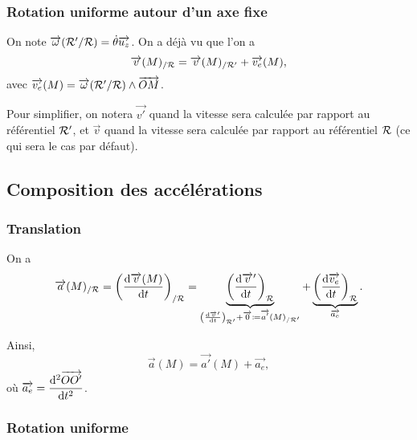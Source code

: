         \subsubsection{Rotation uniforme autour d'un axe fixe}

            On note $\protect\overrightarrow{{\omega}}(\mathcal{R}'/\mathcal{R})=\dot{\theta}\protect\overrightarrow{{u_z}}$. On a déjà vu que l'on a 
            \begin{equation}
                \protect\overrightarrow{{v}}(M)_{/\mathcal{R}}=\protect\overrightarrow{{v}}(M)_{/\mathcal{R}'}+\protect\overrightarrow{{v_e}}(M),
            \end{equation}
            avec $\protect\overrightarrow{{v_e}}(M)=\protect\overrightarrow{{\omega}}(\mathcal{R}'/\mathcal{R})\wedge\protect\overrightarrow{{OM}}$.

            Pour simplifier, on notera $\vec{v'}$ quand la vitesse sera calculée par rapport au référentiel $\mathcal{R}'$, et $\vec{v}$ quand la vitesse sera calculée par rapport au référentiel $\mathcal{R}$ (ce qui sera le cas par défaut).

    \subsection{Composition des accélérations}

        \subsubsection{Translation}

            On a
            \begin{equation}
                \protect\overrightarrow{{a}}(M)_{/\mathcal{R}}=\left(\dfrac{\mathrm{d}\protect\overrightarrow{{v}}(M)}{\mathrm{d} t}\right)_{/\mathcal{R}}=
                \underbrace{\left(\frac{\mathrm{d}\protect\overrightarrow{{v}}'}{\mathrm{d} t}\right)_{\mathcal{R}}}_{\left(\frac{\mathrm{d}\protect\overrightarrow{{v}}'}{\mathrm{d} t}\right)_{\mathcal{R}'}+\protect\overrightarrow{{0}}\coloneqq\protect\overrightarrow{{a'}}(M)_{/\mathcal{R}'}}
                +\underbrace{\left(\frac{\mathrm{d}\protect\overrightarrow{{v_e}}}{\mathrm{d} t}\right)_{\mathcal{R}}}_{\protect\overrightarrow{{a_e}}}.
            \end{equation}

            Ainsi,
            \begin{equation}
                \boxed{
                    \vec{a}(M)=\vec{a'}(M)+\vec{a_e},
                }
            \end{equation}
            où $\protect\overrightarrow{{a_e}}=\dfrac{\mathrm{d}^{2}\protect\overrightarrow{{OO'}}}{\mathrm{d} t^{2}}$.

        \subsubsection{Rotation uniforme}

